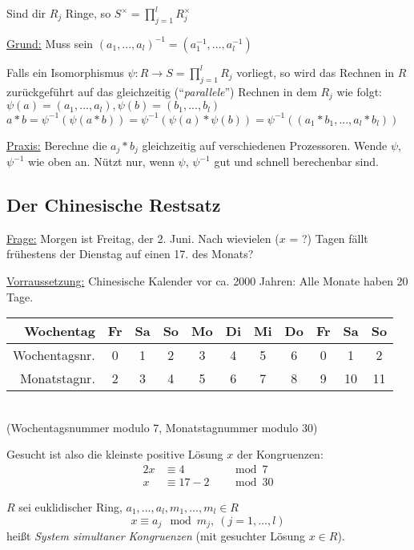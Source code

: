 \documentclass[a4paper,twoside,DIV15,BCOR12mm]{scrbook}
\begin{document}
\begin{lemma}
Sind dir $R_j$ Ringe, so $S^\times = \prod_{j=1}^lR_j^\times$
\end{lemma}

\underline{Grund:} Muss sein $(a_1, ..., a_l)^{-1} = (a_1^{-1}, ...,
a_l^{-1})$

Falls ein Isomorphismus $\psi: R \to S = \prod_{j=1}^lR_j$ vorliegt, so wird das Rechnen in $R$ zurückgeführt auf das gleichzeitig ("`\emph{parallele}"') Rechnen in dem $R_j$ wie folgt:\\
$\psi(a) = (a_1,...,a_l), \psi(b) = (b_1,...,b_l)$\\
$a \ast b = \psi^{-1}(\psi(a \ast b)) = \psi^{-1}(\psi(a) \ast
\psi(b)) = \psi^{-1}((a_1 \ast b_1, ..., a_l \ast b_l))$

\underline{Praxis:} Berechne die $a_j \ast b_j$ gleichzeitig auf
verschiedenen Prozessoren. Wende $\psi$, $\psi^{-1}$ wie oben an.
Nützt nur, wenn $\psi$, $\psi^{-1}$ gut und schnell berechenbar
sind.

\subsection{Der Chinesische Restsatz}

\underline{Frage:} Morgen ist Freitag, der 2. Juni. Nach wievielen
($x$ = ?) Tagen fällt frühestens der Dienstag auf einen 17. des
Monats?

\underline{Vorraussetzung:} Chinesische Kalender vor ca. 2000
Jahren: Alle Monate haben 20 Tage.

\begin{tabular}{|r|c|c|c|c|c|c|c|c|c|c|}
    \hline
    Wochentag     & Fr & Sa & So & Mo & Di & Mi & Do & Fr & Sa & So \\
    \hline
    Wochentagsnr. & 0  & 1  & 2  & 3  & 4  & 5  & 6  & 0  & 1  & 2  \\
    \hline
    Monatstagnr.  & 2  & 3  & 4  &  5 & 6  & 7  & 8  & 9  & 10 & 11 \\
    \hline
\end{tabular}
\\(Wochentagsnummer modulo 7, Monatstagnummer modulo 30)

Gesucht ist also die kleinste positive Lösung $x$ der Kongruenzen:
\begin{alignat*}{2}
    x &\equiv 4 &&\mod 7\\
    x &\equiv 17-2 &&\mod 30
\end{alignat*}

$R$ sei euklidischer Ring, $a_1,\ldots,a_l, m_1,\ldots,m_l \in R$\\
\begin{equation}\label{eq:SystemSimultanerKongruenz}
x \equiv a_j \mod m_j,\ (j = 1, \ldots, l)
\end{equation}
heißt \emph{System simultaner Kongruenzen} (mit gesuchter Lösung $x
\in R$).
\end{document}
